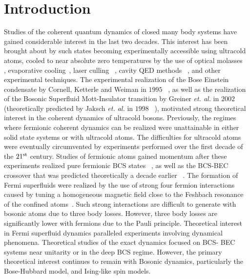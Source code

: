 \documentclass[aps,pra,floats,epsfig,pdflatex]{revtex4}                                                              %
\begin{document}
\section{Introduction}
\label{intro}
 Studies of the coherent quantum dynamics of closed many body systems have gained considerable interest in the last two decades. This interest has been brought about by such states becoming experimentally accessible using ultracold atoms, cooled to near absolute zero temperatures by the use of optical molasses~\cite{mollases:seminal} , evaporative cooling~\cite{bec},  laser culling~\cite{culling} , cavity QED methods~\cite{mmc} , and other experimental techniques. The experimental realization of the Bose Einstein condensate by Cornell, Ketterle and Weiman in $1995$~\cite{bec} , as well as the realization of the Bosonic Superfluid Mott-Insulator transition by Greiner \textit{et. al.} in $2002$~\cite{greiner} (theoretically predicted by Jaksch \textit{et. al.} in $1998$~\cite{jaksch} ), motivated strong theoretical interest in the coherent dynamics of ultracold bosons. Previously, the regimes where fermionic coherent dynamics can be realized were unattainable in either solid state systems or with ultracold 
atoms. The difficulties for ultracold atoms were eventually circumvented by experiments performed over the first decade of the $21^{\rm st}$ century. Studies of fermionic atoms gained momentum after these experiments realized  pure fermionic BCS states~\cite{exp1}  , as well as the BCS-BEC crossover that was predicted theoretically a decade earlier~\cite{bcsbec} . The formation of Fermi superfluids were realized by the use of strong four fermion interactions caused by tuning a homogeneous magnetic field close to the Feshbach resonance of the confined atoms~\cite{feshbach}. Such strong interactions are difficult to generate with bosonic atoms due to three body losses. However, three body losses are significantly lower with fermions due to the Pauli principle. Theoretical interest in Fermi superfluid dynamics paralleled experiments involving dynamical phenomena. Theoretical studies of the exact dynamics focused on BCS-
BEC systems near unitarity or in the deep BCS regime. However, the primary theoretical interest continues to remain with Bosonic dynamics, particularly the Bose-Hubbard model, and Ising-like spin models.
\end{document}
